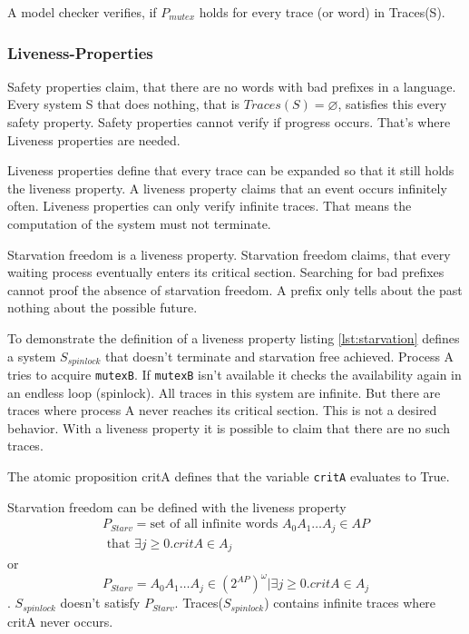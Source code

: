 \documentclass[a4paper, twoside]{article}
\begin{document}
A model checker verifies, if $P_{mutex}$ holds for every trace (or word) in Tra\-ces(S).

\subsubsection{Liveness-Properties}
\label{sec:liveness}

Safety properties claim, that there are no words with bad prefixes in a language. Every system S that does nothing, that is $Traces(S)=\varnothing$, satisfies this every safety property. Safety properties cannot verify if progress occurs. That's where Liveness properties are needed.

Liveness properties define that every trace can be expanded so that it still holds the liveness property. A liveness property claims that an event occurs infinitely often. Liveness properties can only verify infinite traces. That means the computation of the system must not terminate.

Starvation freedom is a liveness property. Starvation freedom claims, that every waiting process eventually enters its critical section. Searching for bad prefixes cannot proof the absence of starvation freedom. A prefix only tells about the past nothing about the possible future.



To demonstrate the definition of a liveness property listing \ref{lst:starvation} defines a system $S_{spinlock}$ that doesn't terminate and starvation free achieved. Process A tries to acquire \texttt{mutexB}. If \texttt{mutexB} isn't available it checks the availability again in an endless loop (spinlock). All traces in this system are infinite. But there are traces where process A never reaches its critical section. This is not a desired behavior. With a liveness property it is possible to claim that there are no such traces.

The atomic proposition critA defines that the variable \texttt{critA} evaluates to True.

Starvation freedom can be defined with the liveness property
\begin{multline}
  \label{eq:starvationfreedom_in_words}
  P_{Starv} = \text{set of all infinite words } A_0 A_1 \dots A_j \in AP \\ \text{ that }\exists j \geq 0. critA \in A_j
\end{multline}
or
\begin{equation}
  \label{eq:starvationfreedom}
P_{Starv} = { A_0 A_1 \dots A_j \in (2^{AP})^{\omega} | \exists j \geq 0. critA \in A_j}
\end{equation}.
$S_{spinlock}$ doesn't satisfy $P_{Starv}$. Traces($S_{spinlock}$) contains infinite traces where critA never occurs.
\end{document}
